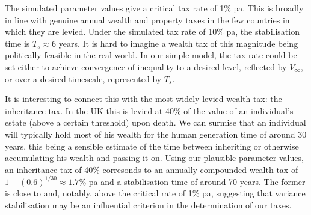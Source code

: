 The simulated parameter values give a critical tax rate of 1\% pa. This is broadly in line 
with genuine annual wealth and property taxes in the few countries in which they are 
levied. Under the simulated tax rate of 10\% pa, the stabilisation time is $T_s\approx6$ 
years. It is hard to imagine a wealth tax of this magnitude being politically feasible in the 
real world. In our simple model, the tax rate could be set either to achieve convergence 
of inequality to a desired level, reflected by $V_\infty$, or over a desired timescale, 
represented by $T_s$.

It is interesting to connect this with the most widely levied wealth tax: the inheritance 
tax. In the UK this is levied at 40\% of the value of an individual's estate (above a 
certain threshold) upon death. We can surmise that an individual will typically hold 
most of his wealth for the human generation time of around 30 years, this being a 
sensible estimate of the time between inheriting or otherwise accumulating his wealth 
and passing it on. Using our plausible parameter values, an inheritance tax of 40\% 
corresonds to an annually compounded wealth tax of $1-(0.6)^{1/30} \approx 1.7\%$ 
pa and a stabilisation time of around 70 years. The former is close to and, notably, 
above the critical rate of 1\% pa, suggesting that variance stabilisation may be an 
influential criterion in the determination of our taxes.

